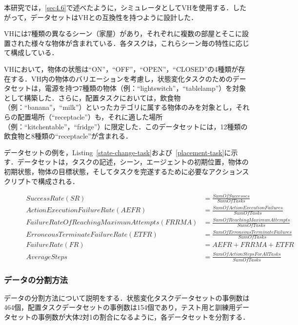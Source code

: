 本研究では，\ref{sec4.6}で述べたように，シミュレータとしてVHを使用する．したがって，データセットはVHとの互換性を持つように設計した．

VHには7種類の異なるシーン（家屋）があり，それぞれに複数の部屋とそこに設置された様々な物体が含まれている．各タスクは，これらシーン毎の特性に応じて構成している．

VHにおいて，物体の状態は``ON''，``OFF''，``OPEN''，``CLOSED''の4種類が存在する．VH内の物体のバリエーションを考慮し，状態変化タスクのためのデータセットは，電源を持つ7種類の物体（例：``lightswitch''，``tablelamp''）を対象として構築した．さらに，配置タスクにおいては，飲食物（例：``banana''，``milk''）といったカテゴリに属する物体のみを対象とし，それらの配置場所（``receptacle''）も，それに適した場所（例：``kitchentable''，``fridge''）に限定した．このデータセットには，12種類の飲食物と8種類の``receptacle''が含まれる．

データセットの例を，Listing~\ref{state-change-task}および~\ref{placement-task}に示す．データセットは，タスクの記述，シーン，エージェントの初期位置，物体の初期状態，物体の目標状態，そしてタスクを完遂するために必要なアクションスクリプトで構成される．

\begin{figure}[tb]
\footnotesize
\begin{align}
 \label{formula5.1}
 Success Rate(SR) &= \frac{Sum Of Successes}{Sum Of Tasks}\\
 \label{formula5.2}
 Action Execution Failure Rate(AEFR) &= \frac{Sum Of Action Execution Failures}{Sum Of Tasks}\\
 \label{formula5.3}
 Failure Rate Of Reaching Maximun Attempts(FRRMA) &= \frac{Sum Of Reaching Maximun Attempts}{Sum Of Tasks}\\
 \label{formula5.4}
 Erroneous Terminate Failure Rate(ETFR) &= \frac{Sum Of Erroneous Terminate Failures}{Sum Of Tasks}\\
 \label{formula5.5}
 Failure Rate(FR) &= AEFR + FRRMA + ETFR\\
 \label{formula5.6}
 Average Steps &= \frac{Sum Of Action Steps For All Tasks}{Sum Of Tasks}
\end{align}
\end{figure}


\subsubsection{データの分割方法}
データの分割方法について説明をする．状態変化タスクデータセットの事例数は464個，配置タスクデータセットの事例数は154個であり，テスト用と訓練用データセットの事例数が大体2対1の割合になるように，各データセットを分割する．

